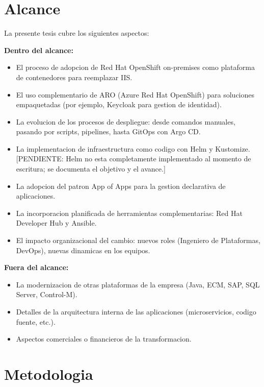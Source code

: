 \hypertarget{alcance}{%
\section{Alcance}\label{alcance}}

La presente tesis cubre los siguientes aspectos:

\textbf{Dentro del alcance:}

\begin{itemize}
\tightlist
\item
  El proceso de adopcion de Red Hat OpenShift on-premises como
  plataforma de contenedores para reemplazar IIS.
\item
  El uso complementario de ARO (Azure Red Hat OpenShift) para soluciones
  empaquetadas (por ejemplo, Keycloak para gestion de identidad).
\item
  La evolucion de los procesos de despliegue: desde comandos manuales,
  pasando por scripts, pipelines, hasta GitOps con Argo CD.
\item
  La implementacion de infraestructura como codigo con Helm y Kustomize.
  {[}PENDIENTE: Helm no esta completamente implementado al momento de
  escritura; se documenta el objetivo y el avance.{]}
\item
  La adopcion del patron App of Apps para la gestion declarativa de
  aplicaciones.
\item
  La incorporacion planificada de herramientas complementarias: Red Hat
  Developer Hub y Ansible.
\item
  El impacto organizacional del cambio: nuevos roles (Ingeniero de
  Plataformas, DevOps), nuevas dinamicas en los equipos.
\end{itemize}

\textbf{Fuera del alcance:}

\begin{itemize}
\tightlist
\item
  La modernizacion de otras plataformas de la empresa (Java, ECM, SAP,
  SQL Server, Control-M).
\item
  Detalles de la arquitectura interna de las aplicaciones
  (microservicios, codigo fuente, etc.).
\item
  Aspectos comerciales o financieros de la transformacion.
\end{itemize}

\hypertarget{metodologia}{%
\section{Metodologia}\label{metodologia}}

